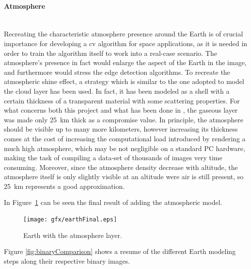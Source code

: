 \paragraph{Atmosphere}\mbox{}\\
Recreating the characteristic atmosphere presence around the Earth is of crucial importance for developing a \acrshort{cv} algorithm for space applications, as it is needed in order to train the algorithm itself to work into a real-case scenario.
The atmosphere's presence in fact would enlarge the aspect of the Earth in the image, and furthermore would stress the edge detection algorithms.
To recreate the atmospheric shine effect, a strategy which is similar to the one adopted to model the cloud layer has been used. In fact, it has been modeled as a shell with a certain thickness of a transparent material with some scattering properties.
For what concerns both this project and what has been done in \cite{jacopo}, the gaseous layer was made only \SI{25}{\km} thick as a compromise value. In principle, the atmosphere should be visible up to many more kilometers, however increasing its thickness comes at the cost of increasing the computational load introduced by rendering a much high atmosphere, which may be not negligible on a standard PC hardware, making the task of compiling a data-set of thousands of images very time consuming. Moreover, since the atmosphere density decrease with altitude, the atmosphere itself is only slightly visible at an altitude were air is still present, so \SI{25}{\km} represents a good approximation.

In Figure~\ref{fig:earthAtmo} can be seen the final result of adding the atmospheric model.

\begin{figure}[htbp]
  \centering
  \texttt{[image: gfx/earthFinal.eps]}
  \caption{Earth with the atmosphere layer.}
  \label{fig:earthAtmo}
\end{figure}

Figure \ref{fig:binaryComparison} shows a resume of the different Earth modeling steps along their respective binary images.

